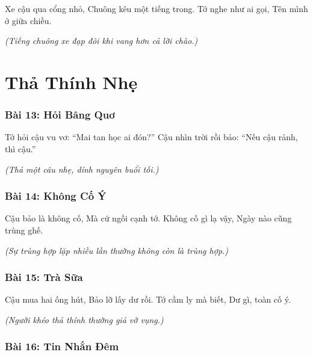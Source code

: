 \documentclass[14pt,a4paper,twoside]{extbook}
\begin{document}
Xe cậu qua cổng nhỏ,
Chuông kêu một tiếng trong.
Tớ nghe như ai gọi,
Tên mình ở giữa chiều.

\vspace{1.5cm}\noindent
\textit{(Tiếng chuông xe đạp đôi khi vang hơn cả lời chào.)}

\newpage

\part{Thả Thính Nhẹ}

\section*{Bài 13: Hỏi Bâng Quơ}

Tớ hỏi cậu vu vơ:
``Mai tan học ai đón?''
Cậu nhìn trời rồi bảo:
``Nếu cậu rảnh, thì cậu.''

\vspace{1.5cm}\noindent
\textit{(Thả một câu nhẹ, dính nguyên buổi tối.)}

\vspace{2cm}

\section*{Bài 14: Không Cố Ý}

Cậu bảo là không cố,
Mà cứ ngồi cạnh tớ.
Không cố gì lạ vậy,
Ngày nào cũng trùng ghế.

\vspace{1.5cm}\noindent
\textit{(Sự trùng hợp lặp nhiều lần thường không còn là trùng hợp.)}

\vspace{2cm}

\section*{Bài 15: Trà Sữa}

Cậu mua hai ống hút,
Bảo lỡ lấy dư rồi.
Tớ cầm ly mà biết,
Dư gì, toàn cố ý.

\vspace{1.5cm}\noindent
\textit{(Người khéo thả thính thường giả vờ vụng.)}

\vspace{2cm}

\section*{Bài 16: Tin Nhắn Đêm}
\end{document}
